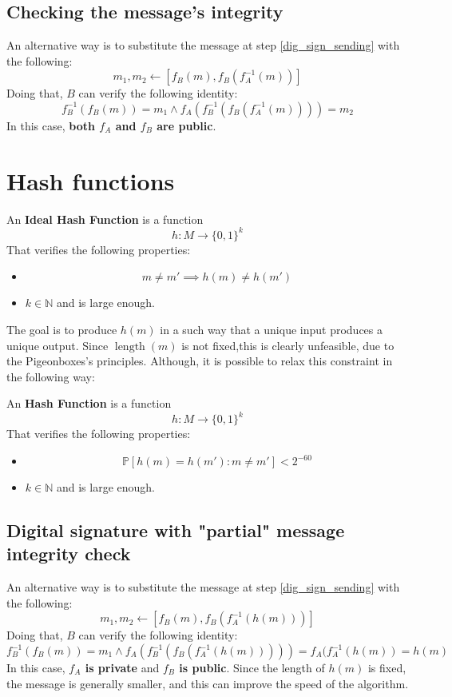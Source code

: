 \subsection{Checking the message's integrity}
An alternative way is to substitute the message at step \ref{dig_sign_sending} with the following:
\[
m_{1}, m_{2} \gets [f_{B}(m), f_{B}(f_{A}^{-1}(m))]
\]
Doing that, $B$ can verify the following identity:
\[
f_{B}^{-1}(f_{B}(m)) = m_{1} \land f_{A}(f_{B}^{-1}(f_{B}(f_{A}^{-1}(m)))) = m_{2}
\]
In this case, \textbf{both $f_{A}$ and $f_{B}$ are public}.

\section{Hash functions}
\begin{definition}
    An \textbf{Ideal Hash Function} is a function
    \[
    h: M \rightarrow \{0,1\}^{k}
    \]
    That verifies the following properties:
    \begin{itemize}
        \item \[m \neq m' \implies h(m) \neq h(m')\]
        \item $k \in \mathbb{N}$ and is large enough.
    \end{itemize}
\end{definition}

The goal is to produce $h(m)$ in a such way that a unique input produces a unique output. Since $\operatorname{length}(m)$ is not fixed,this is clearly unfeasible, due to the Pigeonboxes's principles.
Although, it is possible to relax this constraint in the following way:
\begin{definition}
    An \textbf{Hash Function} is a function
    \[
    h: M \rightarrow \{0,1\}^{k}
    \]
    That verifies the following properties:
    \begin{itemize}
        \item \[\mathbb{P}[h(m) = h(m'): m \neq m'] < 2^{-60}\]
        \item $k \in \mathbb{N}$ and is large enough.
    \end{itemize}
\end{definition}

\subsection{Digital signature with "partial" message integrity check}
An alternative way is to substitute the message at step \ref{dig_sign_sending} with the following:
\[
m_{1}, m_{2} \gets [f_{B}(m), f_{B}(f_{A}^{-1}(h(m)))]
\]
Doing that, $B$ can verify the following identity:
\[
f_{B}^{-1}(f_{B}(m)) = m_{1} \land f_{A}(f_{B}^{-1}(f_{B}(f_{A}^{-1}(h(m))))) = f_{A}(f_{A}^{-1}(h(m)) = h(m)
\]
In this case, \textbf{$f_{A}$ is private} and \textbf{$f_{B}$ is public}. \newline
Since the length of $h(m)$ is fixed, the message is generally smaller, and this can improve the speed of the algorithm.

